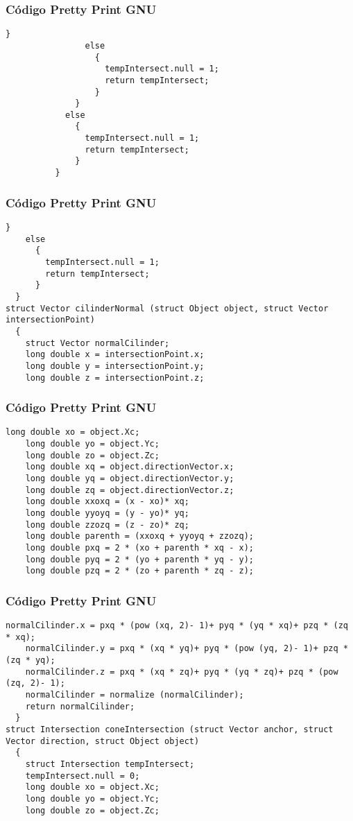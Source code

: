 \documentclass{beamer}
\begin{document}
\begin{frame}[fragile]
\frametitle{C\'odigo Pretty Print GNU}
\begin{lstlisting}[style=CStyle]
                  }
                else
                  {
                    tempIntersect.null = 1;
                    return tempIntersect;
                  }
              }
            else
              {
                tempIntersect.null = 1;
                return tempIntersect;
              }
          }
\end{lstlisting}
\end{frame}
\begin{frame}[fragile]
\frametitle{C\'odigo Pretty Print GNU}
\begin{lstlisting}[style=CStyle]
      }
    else
      {
        tempIntersect.null = 1;
        return tempIntersect;
      }
  }
struct Vector cilinderNormal (struct Object object, struct Vector intersectionPoint)
  {
    struct Vector normalCilinder;
    long double x = intersectionPoint.x;
    long double y = intersectionPoint.y;
    long double z = intersectionPoint.z;
\end{lstlisting}
\end{frame}
\begin{frame}[fragile]
\frametitle{C\'odigo Pretty Print GNU}
\begin{lstlisting}[style=CStyle]
    long double xo = object.Xc;
    long double yo = object.Yc;
    long double zo = object.Zc;
    long double xq = object.directionVector.x;
    long double yq = object.directionVector.y;
    long double zq = object.directionVector.z;
    long double xxoxq = (x - xo)* xq;
    long double yyoyq = (y - yo)* yq;
    long double zzozq = (z - zo)* zq;
    long double parenth = (xxoxq + yyoyq + zzozq);
    long double pxq = 2 * (xo + parenth * xq - x);
    long double pyq = 2 * (yo + parenth * yq - y);
    long double pzq = 2 * (zo + parenth * zq - z);
\end{lstlisting}
\end{frame}
\begin{frame}[fragile]
\frametitle{C\'odigo Pretty Print GNU}
\begin{lstlisting}[style=CStyle]
    normalCilinder.x = pxq * (pow (xq, 2)- 1)+ pyq * (yq * xq)+ pzq * (zq * xq);
    normalCilinder.y = pxq * (xq * yq)+ pyq * (pow (yq, 2)- 1)+ pzq * (zq * yq);
    normalCilinder.z = pxq * (xq * zq)+ pyq * (yq * zq)+ pzq * (pow (zq, 2)- 1);
    normalCilinder = normalize (normalCilinder);
    return normalCilinder;
  }
struct Intersection coneIntersection (struct Vector anchor, struct Vector direction, struct Object object)
  {
    struct Intersection tempIntersect;
    tempIntersect.null = 0;
    long double xo = object.Xc;
    long double yo = object.Yc;
    long double zo = object.Zc;
\end{lstlisting}
\end{frame}
\end{document}
